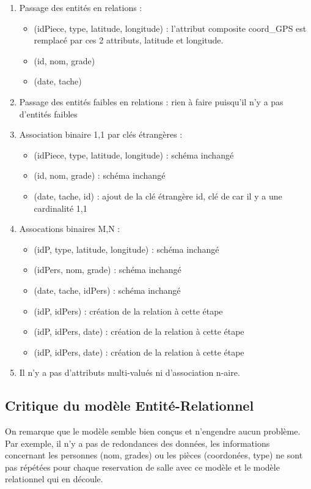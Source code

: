 \begin{enumerate}
	\item Passage des entités en relations :
		\begin{itemize}
			\item {}(idPiece, type, latitude, longitude) : l'attribut composite coord\_GPS est remplacé par ces 2 attributs, latitude et longitude.
			\item {}(id, nom, grade)
			\item {}(date, tache) 
		\end{itemize}
	\item Passage des entités faibles en relations : rien à faire puisqu'il n'y a pas d'entités faibles
	\item Association binaire 1,1 par clés étrangères :
		\begin{itemize}
			\item {}(idPiece, type, latitude, longitude) : schéma inchangé
			\item {}(id, nom, grade) : schéma inchangé
			\item {}(date, tache, id) : ajout de la clé étrangère id, clé de  car il y a une cardinalité 1,1
		\end{itemize}
	\item Assocations binaires M,N :
		\begin{itemize}
			\item {}(idP, type, latitude, longitude) : schéma inchangé
			\item {}(idPers, nom, grade) : schéma inchangé
			\item {}(date, tache, idPers) : schéma inchangé
			\item {}(idP, idPers) : création de la relation  à cette étape
			\item {}(idP, idPers, date) : création de la relation  à cette étape
			\item {}(idP, idPers, date) : création de la relation  à cette étape
		\end{itemize}
	\item Il n'y a pas d'attributs multi-valués ni d'association n-aire.
\end{enumerate}

\subsection{Critique du modèle Entité-Relationnel}
	On remarque que le modèle semble bien conçus et n'engendre aucun problème. Par exemple, il n'y a pas de redondances des données, les informations concernant les personnes (nom, grades) ou les pièces (coordonées, type) ne sont pas répétées pour chaque reservation de salle avec ce modèle et le modèle relationnel qui en découle. 
	
